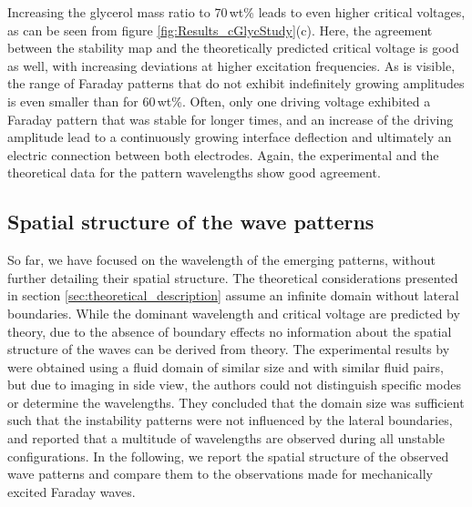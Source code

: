 \documentclass{jfm_arxiv}
\begin{document}
Increasing the glycerol mass ratio to \mbox{70\,wt\%} leads to even higher critical voltages, as can be seen from figure \ref{fig:Results_cGlycStudy}(c). Here, the agreement between the stability map and the theoretically predicted critical voltage is good as well, with increasing deviations at higher excitation frequencies.
As is visible, the range of Faraday patterns that do not exhibit indefinitely growing amplitudes is even smaller than for \mbox{60\,wt\%}. Often, only one driving voltage exhibited a Faraday pattern that was stable for longer times, and an increase of the driving amplitude lead to a continuously growing interface deflection and ultimately an electric connection between both electrodes. Again, the experimental and the theoretical data for the pattern wavelengths show good agreement.

\subsection{Spatial structure of the wave patterns}

So far, we have focused on the wavelength of the emerging patterns, without further detailing their spatial structure. 
The theoretical considerations presented in section \ref{sec:theoretical_description} assume an infinite domain without lateral boundaries.
While the dominant wavelength and critical voltage are predicted by theory, due to the absence of boundary effects no information about the spatial structure of the waves can be derived from theory.
The experimental results by \citet{Ward2019} were obtained using a fluid domain of similar size and with similar fluid pairs, but due to imaging in side view, the authors could not distinguish specific modes or determine the wavelengths.
They concluded that the domain size was sufficient such that the instability patterns were not influenced by the lateral boundaries, and reported that a multitude of wavelengths are observed during all unstable configurations.
In the following, we report the spatial structure of the observed wave patterns and compare them to the observations made for mechanically excited Faraday waves.
\end{document}
